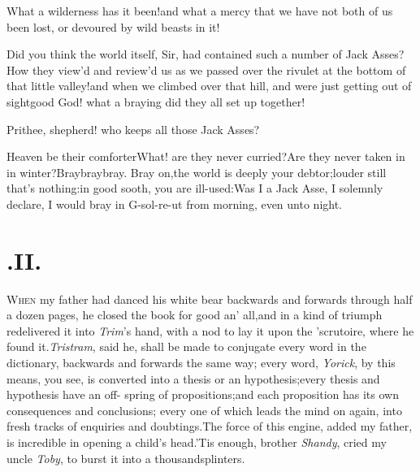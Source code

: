 \documentclass{article}
\begin{document}
\tsh What a wilderness has it been!\break and what a mercy
that we have not both of us been lost, or devoured by wild beasts
in it!

Did you think the world itself, Sir, had contained such a number
of Jack Asses?\tsh How they view’d and
review’d us as we passed over the rivulet at the bottom of
that little valley!\tsh and when we climbed over that
hill, and were just getting out of sight\tsk good God! what a
braying did they all set up together!

\tsh Prithee, shepherd! who keeps all those
Jack Asses? \quad\ast\quad\ast\quad\ast

\tsh Heaven be their comforter\tsh\break What! are
they never curried?\tsh Are they never taken in in
winter?\tsh Bray\break bray\tsk bray. Bray on,\tsk the world
is deeply your debtor;\tsh louder still\tsk{} that’s
nothing:\tsk in good sooth, you are ill-used:\tsh Was I
a Jack Asse, I solemnly declare, I would bray in G-sol-re-ut from
morning, even unto night.

\section{.\enspace II.}

\lettrine{W}{hen} my father had danced his white bear backwards and forwards through
half a dozen pages, he closed the book for good an’ all,\tsk and in a kind of
triumph redelivered it into \textit{Trim}’s hand, with a nod to lay it upon the
’scrutoire, where he found it.\tsh \textit{Tristram}, said he, shall be made to
conjugate every word in the dictionary, backwards and forwards the same way;\tsh
every word, \textit{Yorick}, by this means, you see, is converted into a thesis or
an hypothesis;\tsk every thesis and hypothesis have an off- spring of
propositions;\tsk and each proposition has its own consequences and conclusions;
every one of which leads the mind on again, into fresh tracks of enquiries and
doubtings.\tsh The force of this engine, added my father, is incredible in opening a
child’s head.\tsh ’Tis enough, brother \textit{Shandy}, cried my uncle
\textit{Toby}, to burst it into a thousand\break splinters.\tsh
\end{document}
